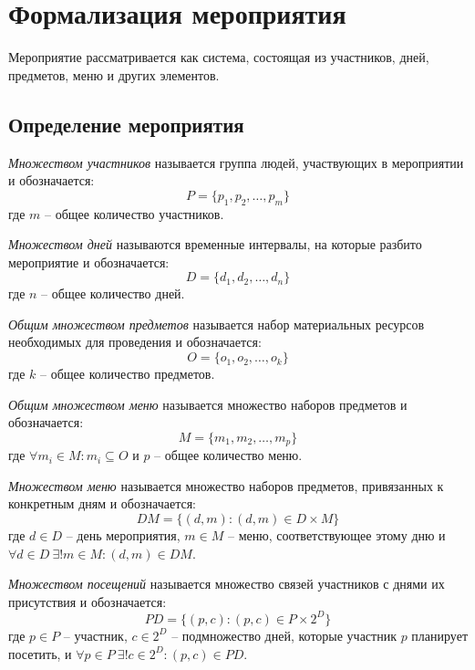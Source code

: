 \section{Формализация мероприятия}

Мероприятие рассматривается как система, состоящая из участников, дней, предметов, меню и других элементов. 

\subsection{Определение мероприятия}

\textit{Множеством участников} называется группа людей, участвующих в мероприятии и обозначается:
\begin{equation}
	P = \{p_1, p_2, \dots, p_m\}
\end{equation}
где $m$ -- общее количество участников.

\textit{Множеством дней} называются временные интервалы, на которые разбито мероприятие и обозначается:
\begin{equation}
	D = \{d_1, d_2, \dots, d_n\}
\end{equation}
где $n$ -- общее количество дней.

\textit{Общим множеством предметов} называется набор материальных ресурсов необходимых для проведения и обозначается:
\begin{equation}
	O = \{o_1, o_2, \dots, o_k\}
\end{equation}
где $k$ -- общее количество предметов.

\textit{Общим множеством меню} называется множество наборов предметов  и обозначается:
\begin{equation}
	M = \{m_1, m_2, \dots, m_p\}
\end{equation}
где $\forall m_i \in M: m_i \subseteq O$ и $p$ -- общее количество меню.

\textit{Множеством меню} называется множество наборов предметов, привязанных к конкретным дням и обозначается:
\begin{equation}
	DM = \{(d, m): (d, m) \in D \times M\}
\end{equation}
где $d \in D$ -- день мероприятия, $m \in M$ -- меню, соответствующее этому дню и $\forall d \in D \ \exists! m \in M: (d, m) \in DM$.

\textit{Множеством посещений} называется множество связей участников с днями их присутствия и обозначается:
\begin{equation}
	PD = \{(p, c): (p, c) \in P \times 2^D \}
\end{equation}
где $p \in P$ -- участник, $c \in 2^D$ -- подмножество дней, которые участник $p$ планирует посетить, и $\forall p \in P \ \exists! c \in 2^D: (p, c) \in PD$.

